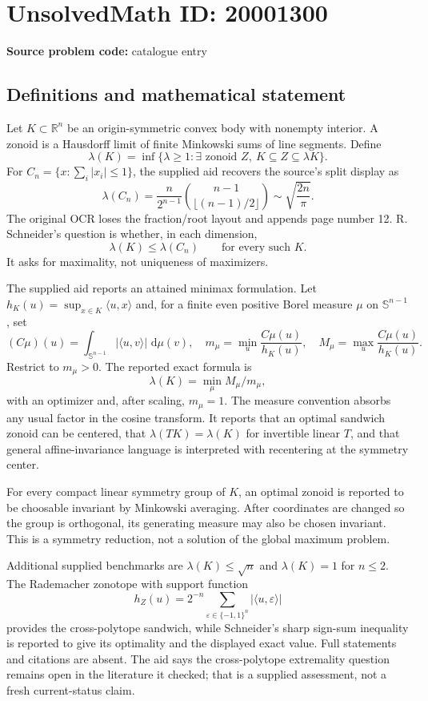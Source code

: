 \documentclass[11pt]{article}
\newcommand{\R}{\mathbb{R}}
\newcommand{\dd}{\,\mathrm{d}}
\begin{document}
\section*{UnsolvedMath ID: 20001300}
\textbf{Source problem code:} catalogue entry
\subsection{Definitions and mathematical statement}
Let \(K\subset\R^n\) be an origin-symmetric convex body with nonempty interior. A zonoid is a Hausdorff limit of finite Minkowski sums of line segments. Define
\[
 \lambda(K)=\inf\{\lambda\ge1:\exists\text{ zonoid }Z,
 \ K\subseteq Z\subseteq\lambda K\}.
\]
For \(C_n=\{x:\sum_i|x_i|\le1\}\), the supplied aid recovers the source's split display as
\[
 \lambda(C_n)=\frac n{2^{n-1}}
 \binom{n-1}{\lfloor(n-1)/2\rfloor}
 \sim\sqrt{\frac{2n}{\pi}}.
\]
The original OCR loses the fraction/root layout and appends page number 12. R. Schneider's question is whether, in each dimension,
\[
 \lambda(K)\le\lambda(C_n)\qquad\text{for every such }K.
\]
It asks for maximality, not uniqueness of maximizers.

The supplied aid reports an attained minimax formulation. Let \(h_K(u)=\sup_{x\in K}\langle u,x\rangle\) and, for a finite even positive Borel measure \(\mu\) on \(\mathbb S^{n-1}\), set
\[
 (C\mu)(u)=\int_{\mathbb S^{n-1}}|\langle u,v\rangle|\,\dd\mu(v),
 \quad m_\mu=\min_u\frac{C\mu(u)}{h_K(u)},\quad
 M_\mu=\max_u\frac{C\mu(u)}{h_K(u)}.
\]
Restrict to \(m_\mu>0\). The reported exact formula is
\[
 \lambda(K)=\min_\mu M_\mu/m_\mu,
\]
with an optimizer and, after scaling, \(m_\mu=1\). The measure convention absorbs any usual factor in the cosine transform. It reports that an optimal sandwich zonoid can be centered, that \(\lambda(TK)=\lambda(K)\) for invertible linear \(T\), and that general affine-invariance language is interpreted with recentering at the symmetry center.

For every compact linear symmetry group of \(K\), an optimal zonoid is reported to be choosable invariant by Minkowski averaging. After coordinates are changed so the group is orthogonal, its generating measure may also be chosen invariant. This is a symmetry reduction, not a solution of the global maximum problem.

Additional supplied benchmarks are \(\lambda(K)\le\sqrt n\) and \(\lambda(K)=1\) for \(n\le2\). The Rademacher zonotope with support function
\[
 h_Z(u)=2^{-n}\sum_{\varepsilon\in\{-1,1\}^n}|\langle u,\varepsilon\rangle|
\]
provides the cross-polytope sandwich, while Schneider's sharp sign-sum inequality is reported to give its optimality and the displayed exact value. Full statements and citations are absent. The aid says the cross-polytope extremality question remains open in the literature it checked; that is a supplied assessment, not a fresh current-status claim.
\end{document}
